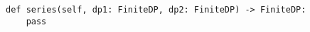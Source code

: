 \begin{verbatim}
def series(self, dp1: FiniteDP, dp2: FiniteDP) -> FiniteDP:
    pass
\end{verbatim}